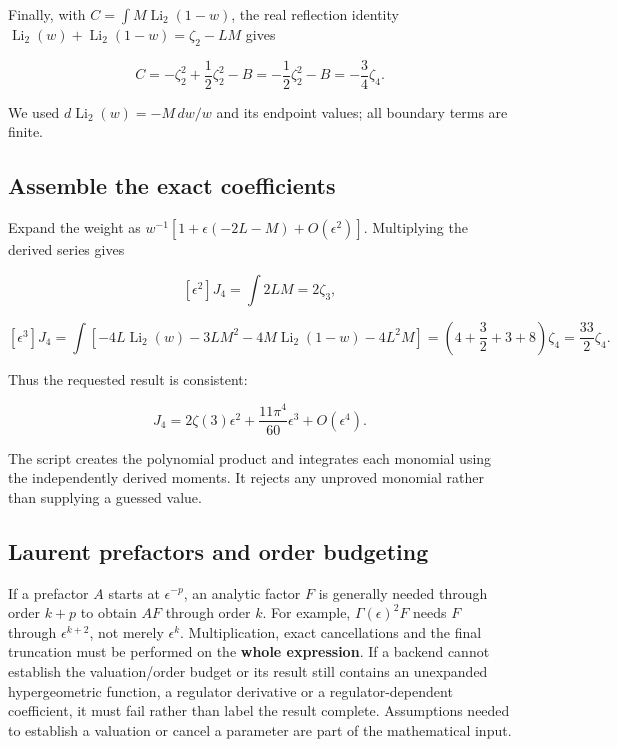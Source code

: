 \documentclass[
  11pt,
]{article}
\begin{document}
Finally, with \(C=\int M\operatorname{Li}_2(1-w)\), the real reflection
identity \(\operatorname{Li}_2(w)+\operatorname{Li}_2(1-w)=\zeta_2-LM\)
gives

\[C=-\zeta_2^2+\frac12\zeta_2^2-B
=-\frac12\zeta_2^2-B=-\frac34\zeta_4.\]

We used \(d\operatorname{Li}_2(w)=-M\,dw/w\) and its endpoint values;
all boundary terms are finite.

\subsection{Assemble the exact
coefficients}\label{assemble-the-exact-coefficients}

Expand the weight as \(w^{-1}[1+\epsilon(-2L-M)+O(\epsilon^2)]\).
Multiplying the derived series gives

\[[\epsilon^2]J_4=\int 2LM=2\zeta_3,\]

\[[\epsilon^3]J_4=\int[-4L\operatorname{Li}_2(w)-3LM^2
-4M\operatorname{Li}_2(1-w)-4L^2M]
=\left(4+\frac32+3+8\right)\zeta_4=\frac{33}{2}\zeta_4.\]

Thus the requested result is consistent:

\[\boxed{J_4=2\zeta(3)\epsilon^2+\frac{11\pi^4}{60}\epsilon^3
+O(\epsilon^4).}\]

The script creates the polynomial product and integrates each monomial
using the independently derived moments. It rejects any unproved
monomial rather than supplying a guessed value.

\subsection{Laurent prefactors and order
budgeting}\label{laurent-prefactors-and-order-budgeting}

If a prefactor \(A\) starts at \(\epsilon^{-p}\), an analytic factor
\(F\) is generally needed through order \(k+p\) to obtain \(AF\) through
order \(k\). For example, \(\Gamma(\epsilon)^2F\) needs \(F\) through
\(\epsilon^{k+2}\), not merely \(\epsilon^k\). Multiplication, exact
cancellations and the final truncation must be performed on the
\textbf{whole expression}. If a backend cannot establish the
valuation/order budget or its result still contains an unexpanded
hypergeometric function, a regulator derivative or a regulator-dependent
coefficient, it must fail rather than label the result complete.
Assumptions needed to establish a valuation or cancel a parameter are
part of the mathematical input.
\end{document}
